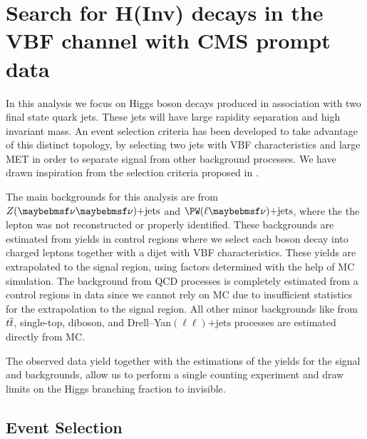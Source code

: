 \chapter{Search for H(Inv) decays in the VBF channel with CMS prompt data}
\label{CHAPTER:PromptDataAnalysis}

\glsresetall %


In this analysis we focus on Higgs boson decays produced in association with two final state quark jets. These jets will have large rapidity separation and high invariant mass. An event selection criteria has been developed to take advantage of this distinct topology, by selecting two jets with \gls{VBF} characteristics and large \gls{MET} in order to separate signal from other background processes. We have drawn inspiration from the selection criteria proposed in \cite{ARTICLE:Zeppenfeld_ObservingAnInvisibleHiggsboson}.

The main backgrounds for this analysis are from $\Z (\nu \nu)\text{+jets}$ and $\PW (\ell \nu)\text{+jets}$, where the the lepton was not reconstructed or properly identified. These backgrounds are estimated from yields in control regions where we select each boson decay into charged leptons together with a dijet with \gls{VBF} characteristics. These yields are extrapolated to the signal region, using factors determined with the help of \gls{MC} simulation. The background from \gls{QCD} processes is completely estimated from a control regions in data since we cannot rely on \gls{MC} due to insufficient statistics for the extrapolation to the signal region. All other minor backgrounds like from $t\overline{t}$, single-top, diboson, and Drell--Yan$(\ell\ell)\text{+jets}$ processes are estimated directly from \gls{MC}. 

The observed data yield together with the estimations of the yields for the signal and backgrounds, allow us to perform a single counting experiment and draw limits on the Higgs branching fraction to invisible.

\section{Event Selection}


